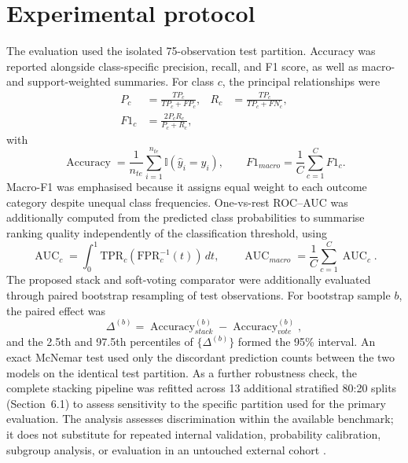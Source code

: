 \documentclass{elektr}
\begin{document}
\section{Experimental protocol}
The evaluation used the isolated 75-observation test partition. Accuracy was reported alongside class-specific precision, recall, and F1 score, as well as macro- and support-weighted summaries. For class $c$, the principal relationships were
\begin{equation}
\begin{aligned}
P_c&=\frac{TP_c}{TP_c+FP_c}, &
R_c&=\frac{TP_c}{TP_c+FN_c},\\
F1_c&=\frac{2P_cR_c}{P_c+R_c},
\end{aligned}
\label{eq:classmetrics}
\end{equation}
with
\begin{equation}
\operatorname{Accuracy}=\frac{1}{n_{te}}\sum_{i=1}^{n_{te}}\mathbb{I}(\hat y_i=y_i),
\qquad
F1_{macro}=\frac{1}{C}\sum_{c=1}^{C}F1_c.
\label{eq:aggregatemetrics}
\end{equation}
Macro-F1 was emphasised because it assigns equal weight to each outcome category despite unequal class frequencies. One-vs-rest ROC--AUC was additionally computed from the predicted class probabilities to summarise ranking quality independently of the classification threshold, using
\begin{equation}
\operatorname{AUC}_c=\int_0^1 \mathrm{TPR}_c(\mathrm{FPR}_c^{-1}(t))\,dt,
\qquad
\operatorname{AUC}_{macro}=\frac{1}{C}\sum_{c=1}^{C}\operatorname{AUC}_c.
\label{eq:auc}
\end{equation}
The proposed stack and soft-voting comparator were additionally evaluated through paired bootstrap resampling of test observations. For bootstrap sample $b$, the paired effect was
\begin{equation}
\Delta^{(b)}=\operatorname{Accuracy}^{(b)}_{stack}
-\operatorname{Accuracy}^{(b)}_{vote},
\label{eq:bootstrap}
\end{equation}
and the 2.5th and 97.5th percentiles of $\{\Delta^{(b)}\}$ formed the 95\% interval. An exact McNemar test used only the discordant prediction counts between the two models on the identical test partition. As a further robustness check, the complete stacking pipeline was refitted across 13 additional stratified 80:20 splits (Section~6.1) to assess sensitivity to the specific partition used for the primary evaluation. The analysis assesses discrimination within the available benchmark; it does not substitute for repeated internal validation, probability calibration, subgroup analysis, or evaluation in an untouched external cohort \cite{collins2024,riley2024,rileysample2024}.
\end{document}
